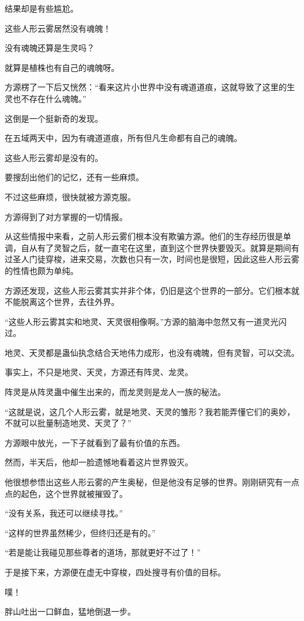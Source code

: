 \begin{this_body}
结果却是有些尴尬。

这些人形云雾居然没有魂魄！

没有魂魄还算是生灵吗？

就算是植株也有自己的魂魄呀。

方源楞了一下后又恍然：“看来这片小世界中没有魂道道痕，这就导致了这里的生灵也不存在什么魂魄。”

这倒是一个挺新奇的发现。

在五域两天中，因为有魂道道痕，所有但凡生命都有自己的魂魄。

这些人形云雾却是没有的。

要搜刮出他们的记忆，还有一些麻烦。

不过这些麻烦，很快就被方源克服。

方源得到了对方掌握的一切情报。

从这些情报中来看，之前人形云雾们根本没有欺骗方源。他们的生存经历很是单调，自从有了灵智之后，就一直宅在这里，直到这个世界快要毁灭。就算是期间有过圣人门徒穿梭，进来交易，次数也只有一次，时间也是很短，因此这些人形云雾的性情也颇为单纯。

方源还发现，这些人形云雾其实并非个体，仍旧是这个世界的一部分。它们根本就不能脱离这个世界，去往外界。

“这些人形云雾其实和地灵、天灵很相像啊。”方源的脑海中忽然又有一道灵光闪过。

地灵、天灵都是蛊仙执念结合天地伟力成形，也没有魂魄，但有灵智，可以交流。

事实上，不只是地灵、天灵，方源还有阵灵、龙灵。

阵灵是从阵灵蛊中催生出来的，而龙灵则是龙人一族的秘法。

“这就是说，这几个人形云雾，就是地灵、天灵的雏形？我若能弄懂它们的奥妙，不就可以批量制造地灵、天灵了？”

方源眼中放光，一下子就看到了最有价值的东西。

然而，半天后，他却一脸遗憾地看着这片世界毁灭。

他很想参悟出这些人形云雾的产生奥秘，但是他没有足够的世界。刚刚研究有一点点的起色，这个世界就被摧毁了。

“没有关系，我还可以继续寻找。”

“这样的世界虽然稀少，但终归还是有的。”

“若是能让我碰见那些尊者的道场，那就更好不过了！”

于是接下来，方源便在虚无中穿梭，四处搜寻有价值的目标。

噗！

胖山吐出一口鲜血，猛地倒退一步。


\end{this_body}
